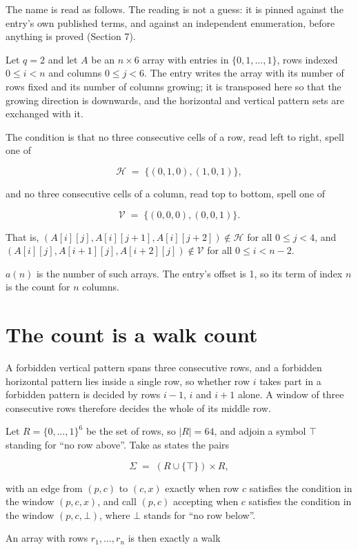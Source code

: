 \documentclass[11pt]{article}
\theoremstyle{definition}
\begin{document}
The name is read as follows. The reading is not a guess: it is pinned against the entry's own published terms, and against an independent enumeration, before anything is proved (Section 7).

Let $q = 2$ and let $A$ be an $n \times 6$ array with entries in $\{0,1,\dots,1\}$, rows indexed $0 \le i < n$ and columns $0 \le j < 6$. The entry writes the array with its number of rows fixed and its number of columns growing; it is transposed here so that the growing direction is downwards, and the horizontal and vertical pattern sets are exchanged with it.

The condition is that no three consecutive cells of a row, read left to right, spell one of

\[\mathcal{H} \;=\; \{(0,1,0), (1,0,1)\},\]

and no three consecutive cells of a column, read top to bottom, spell one of

\[\mathcal{V} \;=\; \{(0,0,0), (0,0,1)\}.\]

That is, $(A[i][j],A[i][j{+}1],A[i][j{+}2]) \notin \mathcal{H}$ for all $0 \le j < 4$, and $(A[i][j],A[i{+}1][j],A[i{+}2][j]) \notin \mathcal{V}$ for all $0 \le i < n-2$.

$a(n)$ is the number of such arrays. The entry's offset is 1, so its term of index $n$ is the count for $n$ columns.

\section{The count is a walk count}

A forbidden vertical pattern spans three consecutive rows, and a forbidden horizontal pattern lies inside a single row, so whether row $i$ takes part in a forbidden pattern is decided by rows $i-1$, $i$ and $i+1$ alone. A window of three consecutive rows therefore decides the whole of its middle row.

Let $R = \{0,\dots,1\}^{6}$ be the set of rows, so $|R| = 64$, and adjoin a symbol $\top$ standing for ``no row above''. Take as states the pairs

\[\Sigma \;=\; (R \cup \{\top\}) \times R,\]

with an edge from $(p,c)$ to $(c,x)$ exactly when row $c$ satisfies the condition in the window $(p,c,x)$, and call $(p,c)$ accepting when $c$ satisfies the condition in the window $(p,c,\bot)$, where $\bot$ stands for ``no row below''.

An array with rows $r_1,\dots,r_n$ is then exactly a walk
\end{document}

